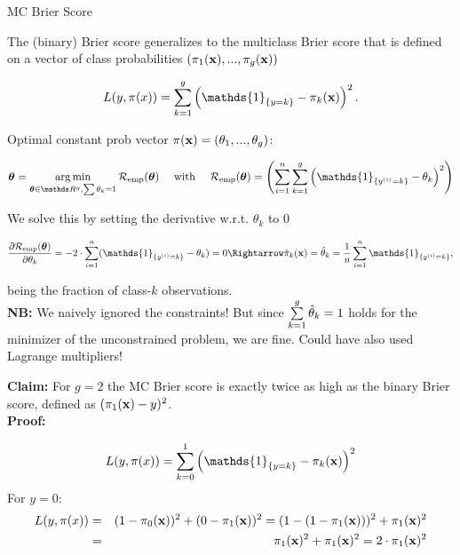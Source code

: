 \documentclass[11pt,compress,t,notes=noshow, xcolor=table]{beamer}
\begin{document}
\begin{vbframe}{MC Brier Score}

The (binary) Brier score generalizes to the multiclass Brier score that is defined on a vector of class probabilities $\left(\pi_1(\mathbf{x}), ..., \pi_g(\mathbf{x})\right)$

\begin{footnotesize}
$$
  L(y, \pi(x)) = \sum_{k = 1}^g \left(\mathds{1}_{\{y = k\}} - \pi_k(\xv)\right)^2.
$$
\end{footnotesize}

Optimal constant prob vector $\pi(\mathbf{x}) = \left(\theta_1, ..., \theta_g\right)$: 

\vspace*{-0.5cm}
\begin{footnotesize}
  \begin{eqnarray*}
    \thetav = \argminlim_{\thetav \in \R^g, \sum \theta_k = 1} \risket \quad \text{ with } \quad \risket = \left(\sumin \sum_{k = 1}^g \left(\mathds{1}_{\{\yi = k\}} - \theta_k\right)^2\right) 
      \end{eqnarray*}
      \end{footnotesize}
        We solve this by setting the derivative w.r.t. $\theta_k$ to 0
        \begin{footnotesize}
      \begin{eqnarray*}
      \frac{\partial \risket}{\partial \theta_k} = - 2 \cdot \sumin (\mathds{1}_{\{\yi = k\}} - \theta_k) = 0 \Rightarrow
    \pikxh = \thetah_k = \frac{1}{n} \sumin \mathds{1}_{\{\yi = k\}},   
    \end{eqnarray*}
\end{footnotesize}
being the fraction of class-$k$ observations. \\
\vspace*{0.3cm}
\footnotesize
\textbf{NB:} We naively ignored the constraints!  But since $\sum\limits^g_{k=1}\hat{\theta}_k=1$ holds for the minimizer of the unconstrained problem, we are fine. Could have also used Lagrange multipliers!

\framebreak

\textbf{Claim:} For $g = 2$ the MC Brier score is exactly twice as high as the binary Brier score, defined as $(\pi_1(\mathbf{x}) - y)^2$. \\
\lz
\textbf{Proof:}
\begin{footnotesize}
$$
  L(y, \pi(x)) = \sum_{k = 0}^1 \left(\mathds{1}_{\{y = k\}} - \pi_k(\xv)\right)^2
  $$
  For $y = 0$:
  \begin{eqnarray*}
  L(y, \pi(x)) &=& (1-\pi_0(\mathbf{x}))^2 + (0 - \pi_1(\mathbf{x}))^2  = (1-(1 - \pi_1(\mathbf{x})))^2 + \pi_1(\mathbf{x})^2 \\
  &=& \pi_1(\mathbf{x})^2 + \pi_1(\mathbf{x})^2 = 2 \cdot \pi_1(\mathbf{x})^2
  \end{eqnarray*}


\end{footnotesize}
\end{vbframe}
\end{document}
